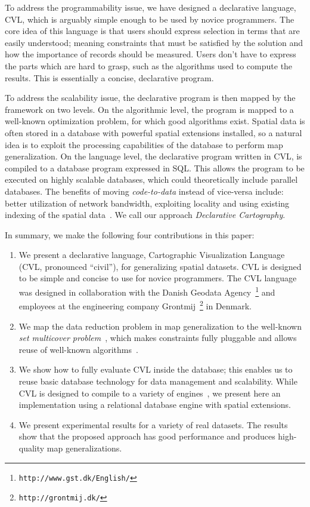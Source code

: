 To address the programmability issue, we have designed a declarative language, CVL, which is arguably simple enough to be used by novice programmers. The core idea of this language is that users should express selection in terms that are easily understood; meaning constraints that must be satisfied by the solution and how the importance of records should be measured. Users don't have to express the parts which are hard to grasp, such as the algorithms used to compute the results. This is essentially a concise, declarative program.

To address the scalability issue, the declarative program is then mapped by the framework on two levels. On the algorithmic level, the program is mapped to a well-known optimization problem, for which good algorithms exist. Spatial data is often stored in a database with powerful spatial extensions installed, so a natural idea is to exploit the processing capabilities of the database to perform map generalization. On the language level, the declarative program written in CVL, is compiled to a database program expressed in SQL. This allows the program to be executed on highly scalable databases, which could theoretically include parallel databases. The benefits of moving \emph{code-to-data} instead of vice-versa include: better utilization of network bandwidth, exploiting locality and using existing indexing of the spatial data~\cite{Guttman1984:RTree,Hellerstein1995:GiST}. We call our approach \emph{Declarative Cartography}.

\vspace{5em}

In summary, we make the following four contributions in this paper:
\begin{enumerate}
\item We present a declarative language, Cartographic Visualization Language (CVL, pronounced ``civil''), for generalizing spatial datasets. CVL is designed to be simple and concise to use for novice programmers. The CVL language was designed in collaboration with the Danish Geodata Agency~\footnote{\texttt{http://www.gst.dk/English/}} and employees at the engineering company Grontmij~\footnote{\texttt{http://grontmij.dk/}} in Denmark.

\item We map the data reduction problem in map generalization to the well-known \emph{set multicover problem}~\cite{rajagopalan1998primal}, which makes constraints fully pluggable and allows reuse of well-known algorithms~\cite{rajagopalan1998primal,vazirani2001approximation}.

\item We show how to fully evaluate CVL inside the database; this enables us to reuse basic database technology for data management and scalability. While CVL is designed to compile to a variety of engines~\cite{Stonebraker:2010:PDBMSvsMapReduce}, we present here an implementation using a relational database engine with spatial extensions.

\item We present experimental results for a variety of real datasets. The results show that the proposed approach has good performance and produces high-quality map generalizations.
\end{enumerate}

